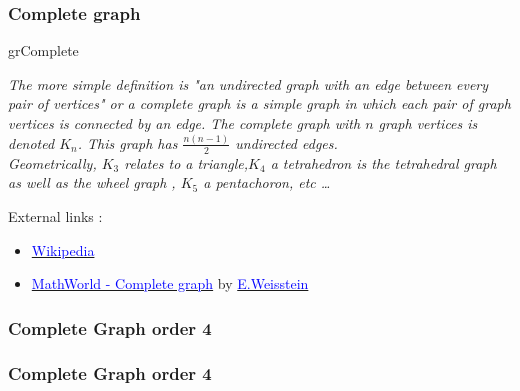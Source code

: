 \newpage
\subsubsection{Complete graph} 
\begin{NewMacroBox}{grComplete}{}

\medskip
\emph{The more simple definition is "an undirected graph with an edge between every pair of vertices"  or a complete graph  is a simple graph  in which each pair of graph vertices is connected by an edge. The complete graph  with  $n$ graph vertices is denoted $K_n$.  This graph has $\frac{n(n-1)}{2}$ undirected edges.\\
Geometrically, $K_3$ relates to a triangle,$ K_4$ a tetrahedron is the tetrahedral graph  as well as the wheel graph , $K_5$ a pentachoron, etc \dots}

\medskip
External links :

\medskip
\begin{itemize}

\item  \href{http://en.wikipedia.org/wiki/Complete_graph}%
            {\textcolor{blue}{Wikipedia}}

\item \href{http://mathworld.wolfram.com/grComplete.html}%
           {\textcolor{blue}{MathWorld - Complete graph}} by %
      \href{http://en.wikipedia.org/wiki/Eric_W._Weisstein}%
           {\textcolor{blue}{E.Weisstein}}
\end{itemize}
\end{NewMacroBox} 


\subsubsection{Complete Graph order 4}
\begin{center}
\begin{tkzexample}[vbox]
\end{tkzexample}
\end{center}


\vfill\newpage\null 

\subsubsection{Complete Graph order 4}
\begin{center}
\begin{tkzexample}[vbox]
\end{tkzexample}
\end{center}

